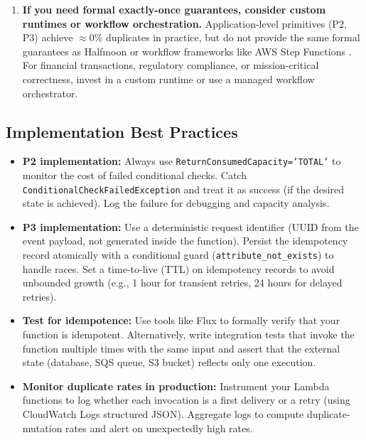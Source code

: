 \begin{enumerate}
    \item \textbf{If you need formal exactly-once guarantees, consider custom runtimes or workflow orchestration.} Application-level primitives (P2, P3) achieve $\approx 0\%$ duplicates in practice, but do not provide the same formal guarantees as Halfmoon \citep{Qi2025Halfmoon} or workflow frameworks like AWS Step Functions \citep{Burckhardt2022Netherite, Zhuang2023ExoFlow}. For financial transactions, regulatory compliance, or mission-critical correctness, invest in a custom runtime or use a managed workflow orchestrator.
\end{enumerate}

\subsection{Implementation Best Practices}

\begin{itemize}
    \item \textbf{P2 implementation:} Always use \texttt{ReturnConsumedCapacity='TOTAL'} to monitor the cost of failed conditional checks. Catch \texttt{ConditionalCheckFailedException} and treat it as success (if the desired state is achieved). Log the failure for debugging and capacity analysis.
    
    \item \textbf{P3 implementation:} Use a deterministic request identifier (UUID from the event payload, not generated inside the function). Persist the idempotency record atomically with a conditional guard (\texttt{attribute\_not\_exists}) to handle races. Set a time-to-live (TTL) on idempotency records to avoid unbounded growth (e.g., 1 hour for transient retries, 24 hours for delayed retries).
    
    \item \textbf{Test for idempotence:} Use tools like Flux \citep{Ding2023Flux} to formally verify that your function is idempotent. Alternatively, write integration tests that invoke the function multiple times with the same input and assert that the external state (database, SQS queue, S3 bucket) reflects only one execution.
    
    \item \textbf{Monitor duplicate rates in production:} Instrument your Lambda functions to log whether each invocation is a first delivery or a retry (using CloudWatch Logs structured JSON). Aggregate logs to compute duplicate-mutation rates and alert on unexpectedly high rates.
\end{itemize}

